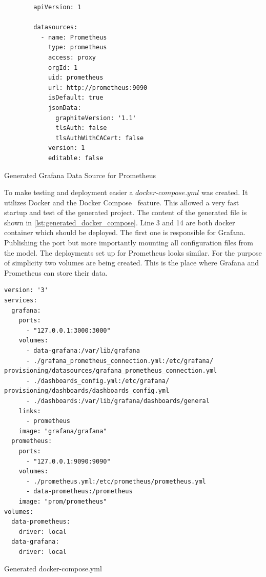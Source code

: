 \begin{listing}[!ht]
	\begin{verbatim}
        apiVersion: 1
        
        datasources:
          - name: Prometheus
            type: prometheus
            access: proxy
            orgId: 1
            uid: prometheus
            url: http://prometheus:9090
            isDefault: true
            jsonData:
              graphiteVersion: '1.1'
              tlsAuth: false
              tlsAuthWithCACert: false
            version: 1
            editable: false
	\end{verbatim}
	\caption{Generated Grafana Data Source for Prometheus}
	\label{lst:generated_data_source}
\end{listing}

To make testing and deployment easier a $docker\text{-}compose.yml$ was created. It utilizes Docker and the Docker Compose~\cite{poulton2019docker} feature.  This allowed a very fast startup and test of the generated project. The content of the generated file is shown in \cref{lst:generated_docker_compose}. Line 3 and 14 are both docker container which should be deployed. The first one is responsible for Grafana. Publishing the port but more importantly mounting all configuration files from the model. The deployments set up for Prometheus looks similar. For the purpose of simplicity two volumes are being created. This is the place where Grafana and Prometheus can store their data.

\begin{listing}[!ht]
	\begin{verbatim}
version: '3'
services:
  grafana:
    ports:
      - "127.0.0.1:3000:3000"
    volumes:
      - data-grafana:/var/lib/grafana
      - ./grafana_prometheus_connection.yml:/etc/grafana/ provisioning/datasources/grafana_prometheus_connection.yml
      - ./dashboards_config.yml:/etc/grafana/ provisioning/dashboards/dashboards_config.yml
      - ./dashboards:/var/lib/grafana/dashboards/general
    links:
      - prometheus
    image: "grafana/grafana"
  prometheus:
    ports:
      - "127.0.0.1:9090:9090"
    volumes:
      - ./prometheus.yml:/etc/prometheus/prometheus.yml
      - data-prometheus:/prometheus
    image: "prom/prometheus"
volumes:
  data-prometheus:
    driver: local
  data-grafana:
    driver: local
	\end{verbatim}
	\caption{Generated docker-compose.yml}
	\label{lst:generated_docker_compose}
\end{listing}

